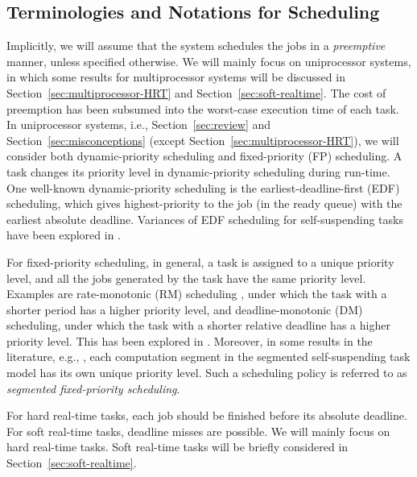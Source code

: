 \subsection{Terminologies and Notations for Scheduling}

Implicitly, we will assume that the system schedules the jobs in a
\emph{preemptive} manner, unless specified otherwise.  We will mainly focus on
uniprocessor systems, in which some results for multiprocessor systems
will be discussed in Section~\ref{sec:multiprocessor-HRT} and
Section~\ref{sec:soft-realtime}. 
 The cost of preemption
has been subsumed into the worst-case execution time of each task. In
uniprocessor systems, i.e., Section~\ref{sec:review} and
Section~\ref{sec:misconceptions} (except Section~\ref{sec:multiprocessor-HRT}), we will consider both
dynamic-priority scheduling and fixed-priority (FP)
scheduling. A task changes its priority level in dynamic-priority
scheduling during run-time. One well-known dynamic-priority scheduling
is the earliest-deadline-first (EDF) scheduling, which gives
highest-priority to the job (in the ready queue) with the earliest
absolute deadline. Variances of EDF scheduling for self-suspending
tasks have been explored in
\cite{RTSS-ChenL14,Liu_2014,DBLP:conf/ecrts/Devi03,WC16-suspend-DATE}.

For fixed-priority scheduling, in general, a task is assigned to a
unique priority level, and all the jobs generated by the task have the
same priority level. Examples are rate-monotonic (RM) scheduling
\cite{Liu_1973}, under which the task with a shorter period has a
higher priority level, and deadline-monotonic (DM) scheduling, under which
the task with a shorter relative deadline has a higher priority level.
This has been explored in
\cite{Raj:suspension1991,RTCSA-KimCPKH95,PH:rtss98,ECRTS-AudsleyB04,RTAS-AudsleyB04,RTCSA-BletsasA05,LR:rtas10,RTSS-KimANR13,LiuChen:rtss2014,huangpass:dac2015,Huang:multiseg,WC16-suspend-DATE}.
Moreover, in some results in the literature, e.g.,
\cite{RTSS-KimANR13,DBLP:journals/ieicet/DingTT09}, each computation
segment in the segmented self-suspending task model has its own unique
priority level. Such a scheduling
policy is referred to as \emph{segmented fixed-priority scheduling}.

For hard real-time tasks, each job should be finished before its
absolute deadline. For soft real-time tasks, deadline misses are
possible. We will mainly focus on hard real-time tasks. 
Soft real-time tasks will be briefly considered in
Section~\ref{sec:soft-realtime}.

